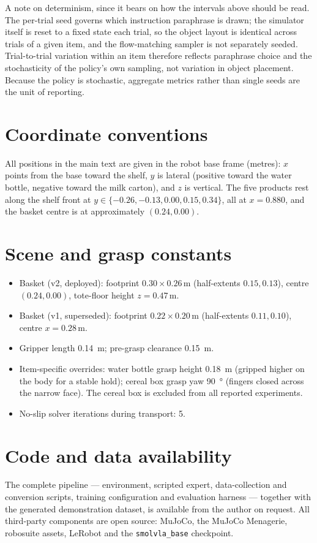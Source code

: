 A note on determinism, since it bears on how the intervals above should be read. The
per-trial seed governs which instruction paraphrase is drawn; the simulator itself is
reset to a fixed state each trial, so the object layout is identical across trials of
a given item, and the flow-matching sampler is not separately seeded. Trial-to-trial
variation within an item therefore reflects paraphrase choice and the stochasticity of
the policy's own sampling, not variation in object placement. Because the policy is
stochastic, aggregate metrics rather than single seeds are the unit of reporting.

\section{Coordinate conventions}
All positions in the main text are given in the robot base frame (metres): $x$ points
from the base toward the shelf, $y$ is lateral (positive toward the water bottle,
negative toward the milk carton), and $z$ is vertical. The five products rest along the
shelf front at $y\in\{-0.26,-0.13,0.00,0.15,0.34\}$, all at $x=0.880$, and the basket
centre is at approximately $(0.24,0.00)$.

\section{Scene and grasp constants}
\begin{itemize}
    \item Basket (v2, deployed): footprint $0.30\times0.26$\,\si{m} (half-extents
    $0.15,0.13$), centre $(0.24,0.00)$, tote-floor height $z=0.47$\,\si{m}.
    \item Basket (v1, superseded): footprint $0.22\times0.20$\,\si{m} (half-extents
    $0.11,0.10$), centre $x=0.28$\,\si{m}.
    \item Gripper length \SI{0.14}{m}; pre-grasp clearance \SI{0.15}{m}.
    \item Item-specific overrides: water bottle grasp height \SI{0.18}{m} (gripped
    higher on the body for a stable hold); cereal box grasp yaw \SI{90}{\degree}
    (fingers closed across the narrow face). The cereal box is excluded from all
    reported experiments.
    \item No-slip solver iterations during transport: 5.
\end{itemize}

\section{Code and data availability}
The complete pipeline --- environment, scripted expert, data-collection and conversion
scripts, training configuration and evaluation harness --- together with the generated
demonstration dataset, is available from the author on request. All third-party
components are open source: MuJoCo, the MuJoCo Menagerie, robosuite assets, LeRobot and
the \texttt{smolvla\_base} checkpoint.
